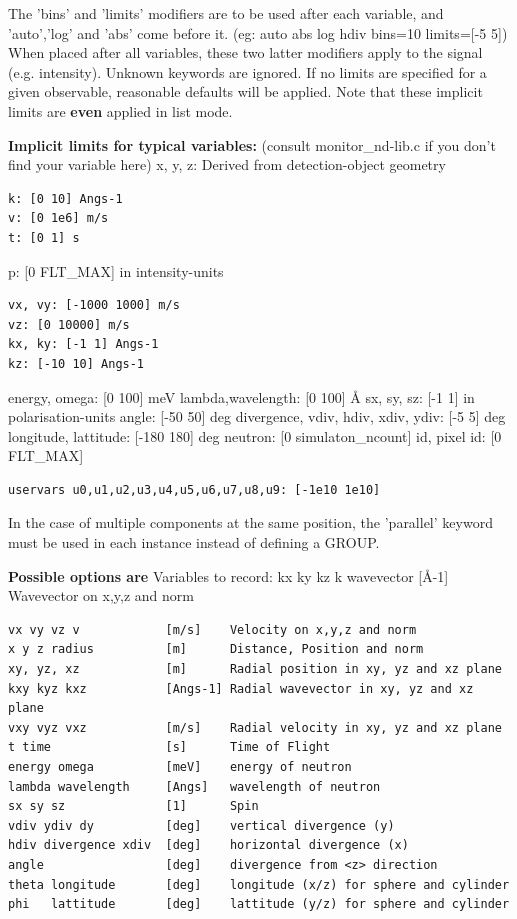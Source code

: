 The 'bins' and 'limits' modifiers are to be used after each variable, and 'auto','log' and 'abs' come before it. (eg: auto abs log hdiv bins=10 limits=[-5 5]) When placed after all variables, these two latter modifiers apply to the signal (e.g. intensity). Unknown keywords are ignored. If no limits are specified for a given observable, reasonable defaults will be applied. Note that these implicit limits are \textbf{even} applied in list mode.

\textbf{Implicit limits for typical variables:} (consult monitor\_nd-lib.c if you don't find your variable here) x, y, z: Derived from detection-object geometry

\begin{verbatim}
k: [0 10] Angs-1
v: [0 1e6] m/s
t: [0 1] s
\end{verbatim}

p: [0 FLT\_MAX] in intensity-units

\begin{verbatim}
vx, vy: [-1000 1000] m/s
vz: [0 10000] m/s
kx, ky: [-1 1] Angs-1
kz: [-10 10] Angs-1
\end{verbatim}

energy, omega: [0 100] meV lambda,wavelength: [0 100] \AA{} sx, sy, sz: [-1 1] in polarisation-units angle: [-50 50] deg divergence, vdiv, hdiv, xdiv, ydiv: [-5 5] deg longitude, lattitude: [-180 180] deg neutron: [0 simulaton\_ncount] id, pixel id: [0 FLT\_MAX]

\begin{verbatim}
uservars u0,u1,u2,u3,u4,u5,u6,u7,u8,u9: [-1e10 1e10]
\end{verbatim}

In the case of multiple components at the same position, the 'parallel' keyword must be used in each instance instead of defining a GROUP.

\textbf{Possible options are} Variables to record: kx ky kz k wavevector [\AA{}-1] Wavevector on x,y,z and norm

\begin{verbatim}
vx vy vz v            [m/s]    Velocity on x,y,z and norm
x y z radius          [m]      Distance, Position and norm
xy, yz, xz            [m]      Radial position in xy, yz and xz plane
kxy kyz kxz           [Angs-1] Radial wavevector in xy, yz and xz plane
vxy vyz vxz           [m/s]    Radial velocity in xy, yz and xz plane
t time                [s]      Time of Flight
energy omega          [meV]    energy of neutron
lambda wavelength     [Angs]   wavelength of neutron
sx sy sz              [1]      Spin
vdiv ydiv dy          [deg]    vertical divergence (y)
hdiv divergence xdiv  [deg]    horizontal divergence (x)
angle                 [deg]    divergence from <z> direction
theta longitude       [deg]    longitude (x/z) for sphere and cylinder
phi   lattitude       [deg]    lattitude (y/z) for sphere and cylinder
\end{verbatim}

